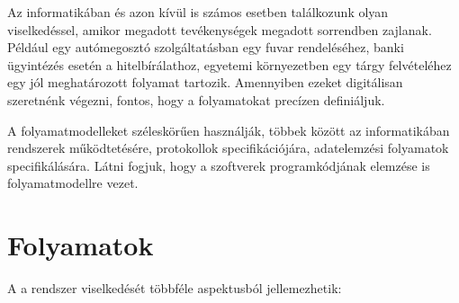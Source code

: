 
\graphicspath{ {./folyamatmodellezes/figures/} }


\newcommand{\folyamatmodellscale}{0.42}
\newcommand{\balhasab}{0.4\linewidth}
\newcommand{\jobbhasab}{0.6\linewidth}


Az informatikában és azon kívül is számos esetben találkozunk olyan viselkedéssel, amikor megadott tevékenységek megadott sorrendben zajlanak. Például egy autómegosztó szolgáltatásban egy fuvar rendeléséhez, banki ügyintézés esetén a hitelbírálathoz, egyetemi környezetben egy tárgy felvételéhez egy jól meghatározott folyamat tartozik. Amennyiben ezeket digitálisan szeretnénk végezni, fontos, hogy a folyamatokat precízen definiáljuk.

A folyamatmodelleket széleskörűen használják, többek között az informatikában rendszerek működtetésére, protokollok specifikációjára, adatelemzési folyamatok specifikálására. Látni fogjuk, hogy a szoftverek programkódjának elemzése is folyamatmodellre vezet.

\section{Folyamatok}

A  a rendszer viselkedését többféle aspektusból jellemezhetik:

